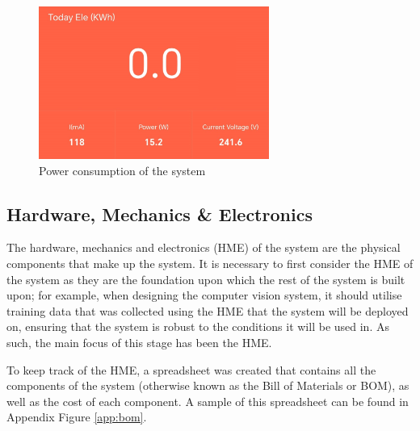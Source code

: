 \begin{figure}[t]
\begin{minipage}[t]{0.22\textwidth}
      \centering
      \includegraphics[width=\textwidth,height=5cm, keepaspectratio]{imgs/parts/powermeter.png}
      \caption{Power consumption of the system}
      \label{fig:powermeter}
  \end{minipage}
\end{figure}

\subsection{Hardware, Mechanics \& Electronics}
The hardware, mechanics and electronics (HME) of the system are the physical components that make up the system.
It is necessary to first consider the HME of the system as they are the foundation upon which the rest of the system is built upon;
for example, when designing the computer vision system, it should utilise training data that was collected using the HME 
that the system will be deployed on, ensuring that the system is robust to the conditions it will be used in. As such,
the main focus of this stage has been the HME.

To keep track of the HME, a spreadsheet was created that contains all the components of the system (otherwise known as the Bill of Materials or BOM),
as well as the cost of each component. A sample of this spreadsheet can be found in Appendix Figure \ref{app:bom}.
